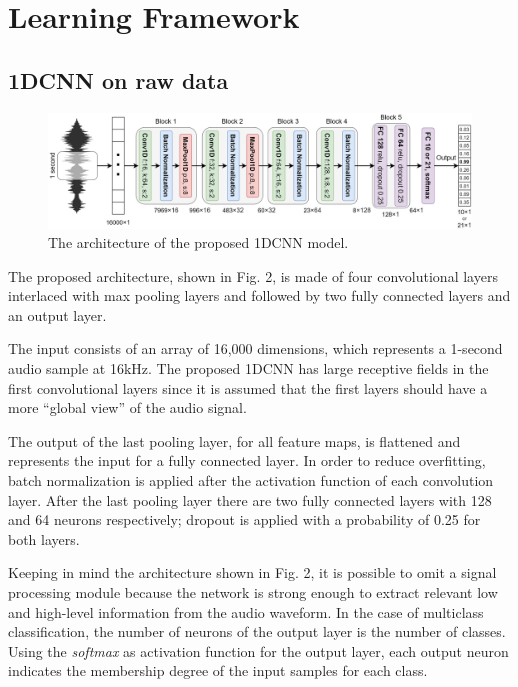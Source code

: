 \documentclass[conference]{IEEEtran}
\begin{document}
\section{Learning Framework}

\vspace{-1mm}
\subsection{1DCNN on raw data}
\begin{figure}
\centering
\includegraphics[scale=0.16]{1DCNN}
\caption{The architecture of the proposed 1DCNN model.}
\end{figure}

The proposed architecture, shown in Fig. 2, is made of four convolutional layers interlaced with max pooling layers and followed by two fully connected layers and an output layer.

The input consists of an array of 16,000 dimensions, which represents a 1-second audio sample at 16kHz.
The proposed 1DCNN has large receptive fields in the first convolutional layers since it is assumed that the first layers should have a more “global view” of the audio signal. 

The output of the last pooling layer, for all feature maps, is flattened and represents the input for a fully connected layer. In order to reduce overfitting, batch normalization is applied after the activation function of each convolution layer. After the last pooling layer there are two fully connected layers with 128 and 64 neurons respectively; dropout is applied with a probability of 0.25 for both layers.

Keeping in mind the architecture shown in Fig. 2, it is possible to omit a signal processing module because the network is strong enough to extract relevant low and high-level information from the audio waveform.
In the case of multiclass classification, the number of neurons of the output layer is the number of classes. Using the \textit{softmax} as activation function for the output layer, each output neuron indicates the membership degree of the input samples for each class.
\end{document}
